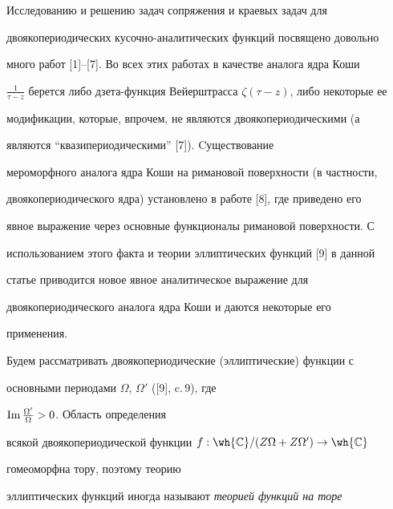 

\maketitle 


\label{begin} 


 


Исследованию и решению задач сопряжения и краевых задач для 


двоякопериодических кусочно-аналитических функций посвящено довольно 


много работ [1]--[7]. Во всех этих работах в качестве аналога ядра Коши 


$\frac{1}{\tau-z}$ берется либо дзета-функция Вейерштрасса $\zeta(\tau-


z)$, либо некоторые ее 


модификации, которые, впрочем, не являются двоякопериодическими (а 


являются ``квазипериодическими'' [7]). Cуществование 


мероморфного аналога ядра Коши на римановой поверхности (в частности, 


двоякопериодического ядра) установлено в работе [8], где приведено его 


явное выражение через основные функционалы римановой поверхности. С 


использованием этого факта и теории эллиптических функций [9] в данной


статье приводится новое явное аналитическое выражение для 


двоякопериодического аналога ядра Коши и даются некоторые его 


применения. 


 


Будем рассматривать двоякопериодические (эллиптические) функции с 


основными периодами $\Omega$, $\Omega'$ ([9], c.\,9), где 


$\operatorname{Im}\frac{\Omega'}{\Omega}>0$. Область определения 


всякой двоякопериодической функции $f:\wh{\Bbb C}/(Z\Omega+Z\Omega')


\to\wh{\Bbb C}$ 


гомеоморфна тору, поэтому теорию 


эллиптических функций иногда называют {\it теорией функций на торе} 


